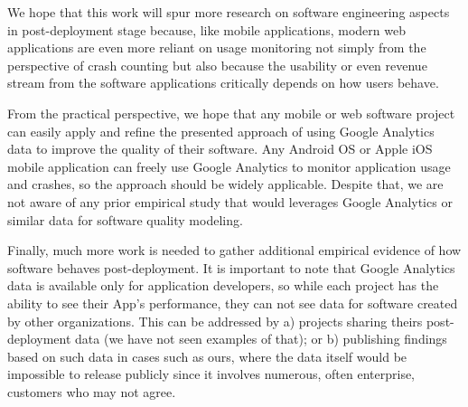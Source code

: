 \documentclass[smallextended]{svjour3}       %
\begin{document}
We hope that this work will spur more research on software engineering
aspects in post-deployment stage because, like mobile applications, 
modern web applications are even more reliant on usage monitoring not
simply from the perspective of crash counting but also because the
usability or even revenue stream from the software applications
critically depends on how users behave. 

From the practical perspective, we hope that any mobile or web
software project can easily apply and refine the presented approach
of using Google Analytics data to improve the quality of their
software.  Any Android OS or Apple iOS mobile application can freely use
Google Analytics to monitor application usage and crashes, so the
approach should be widely applicable. Despite that, we 
are not aware of any prior empirical study that would leverages Google
Analytics or similar data for software quality modeling.


Finally, much more work is needed to gather additional empirical
evidence of how software behaves post-deployment. It is important to
note that Google Analytics data is available only for application
developers, so while each project has the ability to see their App's
performance, they can not see data for software created by other
organizations. This can be addressed by a) projects sharing theirs
post-deployment data (we have not seen examples of that); or b)
publishing findings based on such data in cases such as ours,
where the data itself would be impossible to release publicly since
it involves numerous, often enterprise, customers who may not agree.





\end{document}

